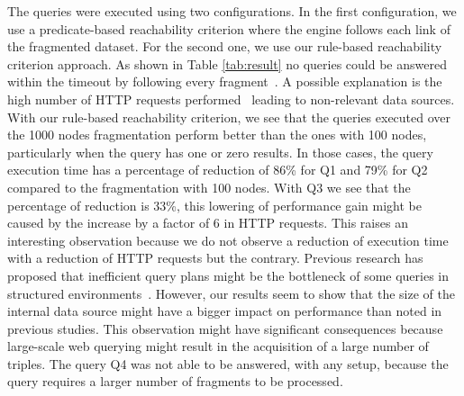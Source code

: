 The queries were executed using two configurations.
In the first configuration, we use a predicate-based reachability criterion where the engine follows each link of the fragmented dataset.
For the second one, we use our rule-based reachability criterion approach.
As shown in Table \ref{tab:result} no queries could be answered within the timeout by following every fragment~.
A possible explanation is the high number of HTTP requests performed~\cite{Hartig2016} leading to non-relevant data sources. 
With our rule-based reachability criterion, we see that the queries executed over the 1000 nodes fragmentation perform better than the ones with 100 nodes, particularly when the query has one or zero results.
In those cases, the query execution time has a percentage of reduction of 86\% for Q1 and 79\% for Q2 compared to the fragmentation with 100 nodes.
With Q3 we see that the percentage of reduction is 33\%, this lowering of performance gain might be caused by the increase by a factor of 6 in HTTP requests.
This raises an interesting observation because we do not observe a reduction of execution time with a reduction of HTTP requests but the contrary.
Previous research has proposed that inefficient query plans might be the bottleneck of some queries in structured environments~\cite{taelman2023,eschauzier_quweda_2023}.
However, our results seem to show that the size of the internal data source might have a bigger impact on performance than noted in previous studies.
This observation might have significant consequences because large-scale web querying might result in the acquisition of a large number of triples.
The query Q4 was not able to be answered, with any setup, because the query requires a larger number of fragments to be processed.